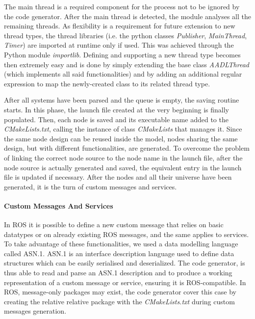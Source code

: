 The main thread is a required component for the process not to be ignored by the code generator. After the main thread is detected, the module analyses all the remaining threads. As flexibility is a requirement for future extension to new thread types, the thread libraries (i.e. the python classes \textit{Publisher}, \textit{MainThread}, \textit{Timer}) are imported at runtime only if used. This was achieved through the Python module \textit{importlib}. Defining and supporting a new thread type becomes then extremely easy and is done by simply extending the base class \textit{AADLThread} (which implements all said functionalities) and by adding an additional regular expression to map the newly-created class to its related thread type.

After all systems have been parsed and the queue is empty, the saving routine starts. In this phase, the launch file created at the very beginning is finally populated. Then, each node is saved and its executable name added to the \textit{CMakeLists.txt}, calling the instance of class \textit{CMakeLists} that manages it. Since the same node design can be reused inside the model, nodes sharing the same design, but with different functionalities, are generated. To overcome the problem of linking the correct node source to the node name in the launch file, after the node source is actually generated and saved, the equivalent entry in the launch file is updated if necessary. After the nodes and all their universe have been generated, it is the turn of custom messages and services.

\paragraph{Custom Messages And Services} In ROS it is possible to define a new custom message that relies on basic datatypes or on already existing ROS messages, and the same applies to services. To take advantage of these functionalities, we used a data modelling language called ASN.1. ASN.1 is an interface description language used to define data structures which can be easily serialised and deserialized. The code generator, is thus able to read and parse an ASN.1 description and to produce a working representation of a custom message or service, ensuring it is ROS-compatible. In ROS, message-only packages may exist, the code generator cover this case by creating the relative relative package with the \textit{CMakeLists.txt} during custom messages generation.

